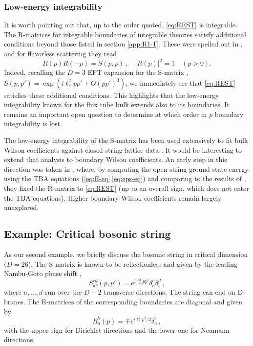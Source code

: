 \documentclass[
 reprint,
 amsmath,
 pre,
 amssymb,
 nofootinbib,
 aps,
 longbibliography,
]{revtex4-1}
\newcommand{\<}{{\langle}}
\renewcommand{\>}{{\rangle}}
\begin{document}
\subsubsection{Low-energy integrability}
It is worth pointing out that, up to the order quoted, \eqref{eq:REST} is integrable. The R-matrices for integrable boundaries of integrable theories satisfy additional conditions beyond those listed in section \ref{app:R1-1}. These were spelled out in \cite{Ghoshal:1993tm,Caselle:2013dra}, and for flavorless scattering they read
\begin{equation}\label{eq:integrable-R}
    R(p) R(-p) = S(p,p)\,, \quad |R(p)|^2 =1 \quad (p>0).
\end{equation}
Indeed, recalling the $D=3$ EFT expansion for the S-matrix \cite{Dubovsky:2012sh,EliasMiro:2019kyf}, $S(p,p') = \exp(i \ell_s^2 p p'+O(pp')^3)$, we immediately see that \eqref{eq:REST} satisfies these additional conditions. This highlights that the low-energy integrability known for the flux tube bulk extends also to its boundaries. It remains an important open question to determine at which order in $p$ boundary integrability is lost.

The low-energy integrability of the S-matrix has been used extensively to fit bulk Wilson coefficients against closed string lattice data \cite{Dubovsky:2013gi,Dubovsky:2014fma}. It would be interesting to extend that analysis to boundary Wilson coefficients. An early step in this direction was taken in \cite{Caselle:2013dra}, where, by computing the open string ground state energy using the TBA equations (\ref{eq:E-eq},\ref{eq:eps-eq}) and comparing to the results of \cite{Aharony:2010db}, they fixed the R-matrix to \eqref{eq:REST} (up to an overall sign, which does not enter the TBA equations). Higher boundary Wilson coefficients remain largely unexplored.

\subsection{Example: Critical bosonic string}\label{app:criticalST}
As our second example, we briefly discuss the bosonic string in critical dimension ($D=26$). The S-matrix is known to be reflectionless and given by the leading Nambu-Goto phase shift \cite{Dubovsky:2012wk},
\begin{equation}\label{eq:S-critical}
    S_{ab}^{cd}(p,p') = e^{i\ell_s^2 pp'}\delta_a^c \delta_b^d\,,
\end{equation}
where $a,...,d$ run over the $D-2$ transverse directions. The string can end on D-branes. The R-matrices of the corresponding boundaries are diagonal and given by
\begin{equation}\label{eq:R-critical}
    R_a^b(p) = \mp e^{i\ell_s^2 p^2/2} \delta_a^b\,,
\end{equation}
with the upper sign for Dirichlet directions and the lower one for Neumann directions.
\end{document}
